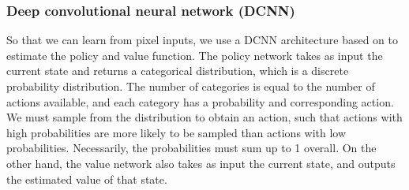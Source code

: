 \documentclass[12pt,a4paper]{article}
\begin{document}



\subsubsection{Deep convolutional neural network (DCNN)}
So that we can learn from pixel inputs, we use a DCNN architecture based on \cite{Mnih2015} to estimate the policy and value function. The policy network takes as input the current state and returns a categorical distribution, which is a discrete probability distribution. The number of categories is equal to the number of actions available, and each category has a probability and corresponding action. We must sample from the distribution to obtain an action, such that actions with high probabilities are more likely to be sampled than actions with low probabilities. Necessarily, the probabilities must sum up to 1 overall. On the other hand, the value network also takes as input the current state, and outputs the estimated value of that state. 
\end{document}
